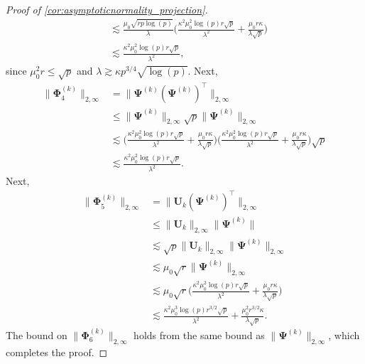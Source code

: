 \documentclass[10pt]{article}
\newcommand{\0}{{\mathbf{0}}}
\newcommand{\1}{{\mathbf{1}}}
\newcommand{\U}{{\mathbf{U}}}
\renewcommand{\t}{^{\top}}
\begin{document}
\begin{proof}[Proof of \cref{cor:asymptoticnormality_projection}]
\begin{align*}
    &\lesssim \frac{\mu_0 \sqrt{rp\log(p)}}{\lambda} \bigg( \frac{ \kappa^2 \mu_0^2 \log(p) r \sqrt{p}}{\lambda^2} + \frac{\mu_0 r \kappa}{\lambda \sqrt{p}} \bigg) \\%
    &\lesssim \frac{ \kappa^2 \mu_0^2 \log(p) r\sqrt{p}}{\lambda^2},
\end{align*}
since $\mu_0^2 r \leq \sqrt{p}$ and $\lambda \gtrsim \kappa p^{3/4} \sqrt{\log(p)}$.  Next,
\begin{align*}
    \| \mathbf{\Phi}^{(k)}_4 \|_{2,\infty} &= \| \mathbf{\Psi}^{(k)} (\mathbf{\Psi}^{(k)})\t \|_{2,\infty} \\
    &\leq \| \mathbf{\Psi}^{(k)} \|_{2,\infty} \sqrt{p} \| \mathbf{\Psi}^{(k)}\|_{2,\infty} \\
    &\lesssim  \bigg( \frac{ \kappa^2 \mu_0^2 \log(p) r \sqrt{p}}{\lambda^2} + \frac{\mu_0 r \kappa}{\lambda \sqrt{p}} \bigg)  \bigg( \frac{ \kappa^2 \mu_0^2 \log(p) r \sqrt{p}}{\lambda^2} + \frac{\mu_0 r \kappa}{\lambda \sqrt{p}} \bigg) \sqrt{p} \\%
    &\lesssim \frac{ \kappa^2 \mu_0^2 \log(p) r\sqrt{p}}{\lambda^2}.
\end{align*}
Next,
\begin{align*}
    \| \mathbf{\Phi}_5^{(k)} \|_{2,\infty} &= \| \U_k (\mathbf{\Psi}^{(k)})\t \|_{2,\infty} \\
    &\leq \| \U_k \|_{2,\infty} \| \mathbf{\Psi}^{(k)} \| \\
    &\lesssim \sqrt{p} \|\U_k\|_{2,\infty} \| \mathbf{\Psi}^{(k)} \|_{2,\infty} \\
     &\lesssim \mu_0 \sqrt{r} \| \mathbf{\Psi}^{(k)} \|_{2,\infty} \\
     &\lesssim  \mu_0 \sqrt{r}  \bigg( \frac{ \kappa^2 \mu_0^2 \log(p) r \sqrt{p}}{\lambda^2} + \frac{\mu_0 r \kappa}{\lambda \sqrt{p}} \bigg) \\
     &\lesssim \frac{\kappa^2 \mu_0^3 \log(p) r^{3/2} \sqrt{p}}{\lambda^2}   + \frac{\mu_0^2 r^{3/2} \kappa}{\lambda \sqrt{p}}.
\end{align*}
The bound on $\|\mathbf{\Phi}_6^{(k)}\|_{2,\infty}$ holds from the same bound as $\|\mathbf{\Psi}^{(k)}\|_{2,\infty}$, which completes the proof.
\end{proof}
\end{document}
